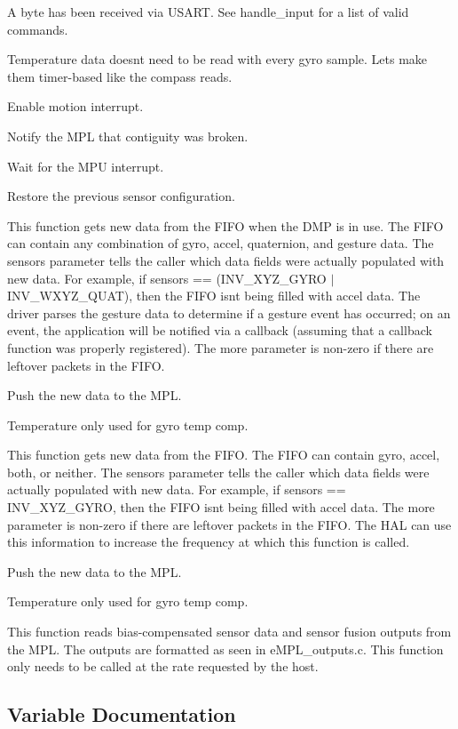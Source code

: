 A byte has been received via U\+S\+A\+RT. See handle\+\_\+input for a list of valid commands.

Temperature data doesn\textquotesingle{}t need to be read with every gyro sample. Let\textquotesingle{}s make them timer-\/based like the compass reads.

Enable motion interrupt.

Notify the M\+PL that contiguity was broken.

Wait for the M\+PU interrupt.

Restore the previous sensor configuration.

This function gets new data from the F\+I\+FO when the D\+MP is in use. The F\+I\+FO can contain any combination of gyro, accel, quaternion, and gesture data. The sensors parameter tells the caller which data fields were actually populated with new data. For example, if sensors == (I\+N\+V\+\_\+\+X\+Y\+Z\+\_\+\+G\+Y\+RO $\vert$ I\+N\+V\+\_\+\+W\+X\+Y\+Z\+\_\+\+Q\+U\+AT), then the F\+I\+FO isn\textquotesingle{}t being filled with accel data. The driver parses the gesture data to determine if a gesture event has occurred; on an event, the application will be notified via a callback (assuming that a callback function was properly registered). The more parameter is non-\/zero if there are leftover packets in the F\+I\+FO.

Push the new data to the M\+PL.

Temperature only used for gyro temp comp.

This function gets new data from the F\+I\+FO. The F\+I\+FO can contain gyro, accel, both, or neither. The sensors parameter tells the caller which data fields were actually populated with new data. For example, if sensors == I\+N\+V\+\_\+\+X\+Y\+Z\+\_\+\+G\+Y\+RO, then the F\+I\+FO isn\textquotesingle{}t being filled with accel data. The more parameter is non-\/zero if there are leftover packets in the F\+I\+FO. The H\+AL can use this information to increase the frequency at which this function is called.

Push the new data to the M\+PL.

Temperature only used for gyro temp comp.

This function reads bias-\/compensated sensor data and sensor fusion outputs from the M\+PL. The outputs are formatted as seen in e\+M\+P\+L\+\_\+outputs.\+c. This function only needs to be called at the rate requested by the host.

\subsection{Variable Documentation}
\mbox{\label{group__e_m_p_l_gaefa1a9bddf56e4d6c5ee8ff3f2175b01}} 
